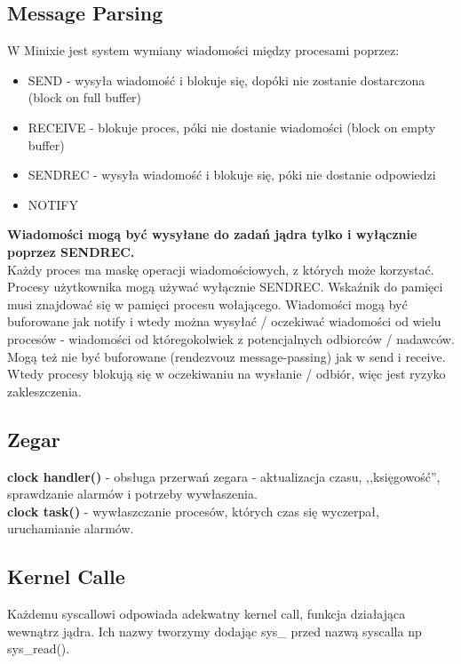 \documentclass[12pt, a4paper, polish, openany]{book}
\begin{document}
\subsection{Message Parsing}
W Minixie jest system wymiany wiadomości między procesami poprzez:
\begin{itemize}
  \item SEND - wysyła wiadomość i blokuje się, dopóki nie zostanie dostarczona (block on full buffer)
  \item RECEIVE - blokuje proces, póki nie dostanie wiadomości (block on empty buffer)
  \item SENDREC - wysyła wiadomość i blokuje się, póki nie dostanie odpowiedzi
  \item NOTIFY
\end{itemize}
\textbf{Wiadomości mogą być wysyłane do zadań jądra tylko i wyłącznie poprzez SENDREC.} \\
Każdy proces ma maskę operacji wiadomościowych, z których może korzystać. Procesy użytkownika mogą używać wyłącznie SENDREC.
Wskaźnik do pamięci musi znajdować się w pamięci procesu wołającego.
Wiadomości mogą być buforowane jak notify i wtedy można wysyłać / oczekiwać wiadomości od wielu procesów - wiadomości od któregokolwiek z potencjalnych odbiorców / nadawców. Mogą też nie być buforowane (rendezvouz message-passing) jak w send i receive. Wtedy procesy blokują się w oczekiwaniu na wysłanie / odbiór, więc jest ryzyko zakleszczenia.
\subsection{Zegar}
\textbf{clock handler()} - obsługa przerwań zegara - aktualizacja czasu, ,,księgowość”, sprawdzanie alarmów i potrzeby wywłaszenia. \\
\textbf{clock task()} - wywłaszczanie procesów, których czas się wyczerpał, uruchamianie alarmów.
\subsection{Kernel Calle}
Każdemu syscallowi odpowiada adekwatny kernel call, funkcja działająca wewnątrz jądra. Ich nazwy tworzymy dodając sys\_ przed nazwą syscalla np sys\_read(). 
\end{document}
